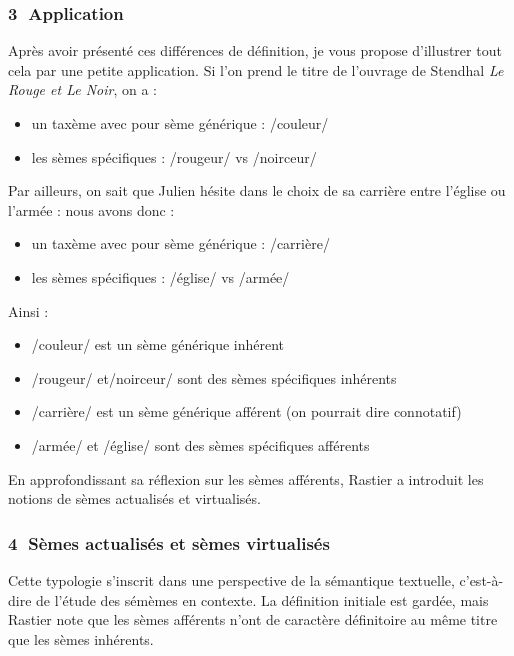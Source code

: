 \subsubsection*{\textcircled{\scriptsize 3} Application}
Après avoir présenté ces différences de définition, je vous propose d’illustrer tout cela par une petite application. Si l’on prend le titre de l’ouvrage de Stendhal \textit{Le Rouge et Le Noir}, on a :
\begin{itemize}
\item un taxème avec pour sème générique : /couleur/
\item les sèmes spécifiques : /rougeur/ vs /noirceur/
\end{itemize}
Par ailleurs, on sait que Julien hésite dans le choix de sa carrière entre l’église ou l’armée : nous avons donc :
\begin{itemize}
\item un taxème avec pour sème générique : /carrière/
\item les sèmes spécifiques : /église/ vs /armée/
\end{itemize}

Ainsi :
\begin{itemize}
\item /couleur/ est un sème générique inhérent
\item /rougeur/ et/noirceur/ sont des sèmes spécifiques inhérents
\item /carrière/ est un sème générique afférent (on pourrait dire connotatif)
\item /armée/ et /église/ sont des sèmes spécifiques afférents
\end{itemize}
En approfondissant sa réflexion sur les sèmes afférents, Rastier a introduit les notions de sèmes actualisés et virtualisés.

\subsubsection*{\textcircled{\scriptsize 4} Sèmes actualisés et sèmes virtualisés}
Cette typologie s’inscrit dans une perspective de la sémantique textuelle, c’est-à-dire de l’étude des sémèmes en contexte. La définition initiale est gardée, mais Rastier note que les sèmes afférents n’ont de caractère définitoire au même titre que les sèmes inhérents.

